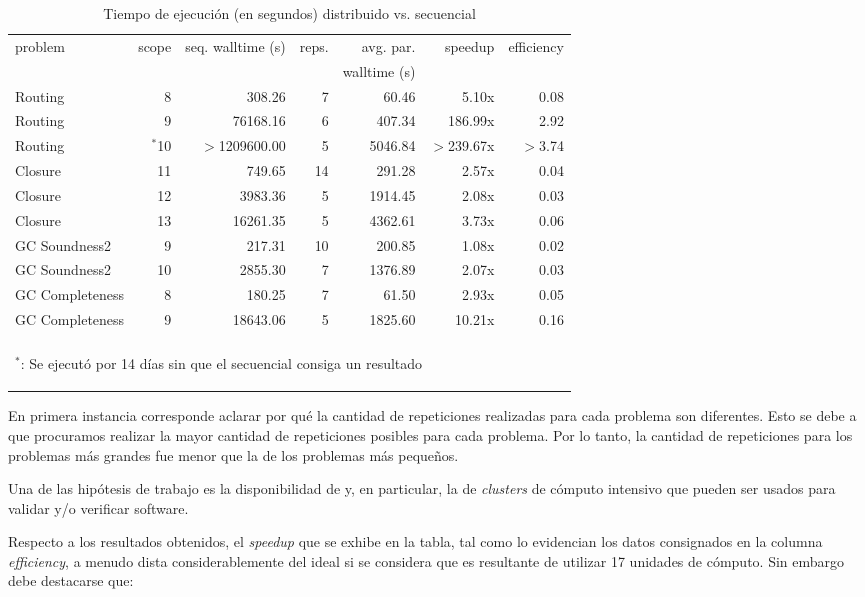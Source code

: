 \begin{table}
	\footnotesize
	\begin{tabular}{lrrrrrr}
		\toprule
		problem	&	scope	&	seq. walltime (s)	&	reps. & avg. par.	&	speedup	&	efficiency \\
			&		&	&	 & walltime (s)	&		&	 \\
		\cmidrule(r){1-7}
		Routing	&	8			&	308.26			&		7 & 60.46	& 5.10x	&	0.08 \\
		Routing	&	9			&	76168.16		&	6& 407.34	& 	186.99x	&	2.92 \\
		Routing	&	$^*$10		&	$>$1209600.00	&	5 & 5046.84	&	$>$239.67x	&	$>$3.74 \\
		\cmidrule(r){1-7}	
		Closure	&	11			&	749.65			&	14 & 291.28	&	2.57x	&	0.04 \\
		Closure	&	12			&	3983.36			&	5 & 1914.45	&	2.08x	&	0.03 \\
		Closure	&	13			&	16261.35		& 5 &	4362.61	&	3.73x	&	0.06 \\
		\cmidrule(r){1-7}
		GC Soundness2	&	9	&	217.31			&	10 & 200.85	&	1.08x	&	0.02 \\
		GC Soundness2	&	10	&	 2855.30		&	7 &1376.89	&	2.07x	&	0.03 \\
		\cmidrule(r){1-7}
		GC Completeness	&	8	&	180.25			&	7 & 61.50	&	2.93x	&	0.05 \\
		GC Completeness	&	9	&	18643.06		&	5 & 1825.60	&	10.21x	&	0.16 \\
		\bottomrule
		\\
		\multicolumn{7}{l}{\begin{tiny}$^*$: Se ejecutó por 14 días sin que el \ssolver secuencial consiga un resultado\end{tiny}}
	\end{tabular}
	\caption{Tiempo de ejecución (en segundos) distribuido vs. secuencial}
	\label{tab:resultados}
\end{table}

En primera instancia corresponde aclarar por qué la cantidad de repeticiones
realizadas para cada problema son diferentes. Esto se debe a que procuramos
realizar la mayor cantidad de repeticiones posibles para cada problema. Por lo
tanto, la cantidad de repeticiones para los problemas más grandes fue menor
que la de los problemas más pequeños.

Una de las hipótesis de trabajo es la disponibilidad de \hard y, en
particular, la de \emph{clusters} de cómputo intensivo que pueden ser usados
para validar y/o verificar software.

Respecto a los resultados obtenidos, el \emph{speedup} que se exhibe en la
tabla, tal como lo evidencian los datos consignados en la columna
\emph{efficiency}, a menudo dista considerablemente del ideal si se considera
que es resultante de utilizar 17 unidades de cómputo. Sin embargo debe
destacarse que:

